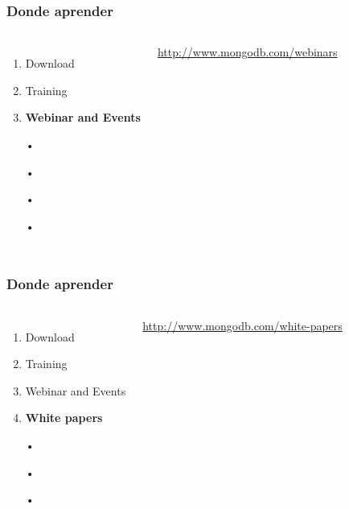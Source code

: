 \documentclass{beamer}
\begin{document}
\begin{frame}
\frametitle{Donde aprender}
\begin{columns}[c] %
\begin{enumerate}
\item Download
\item Training
\item \textbf{Webinar and Events}
\item[•]
\item[•]
\item[•]
\item[•]
\end{enumerate}

{\color{blue}\url{http://www.mongodb.com/webinars}}
\end{columns}
\end{frame}
\begin{frame}
\frametitle{Donde aprender}
\begin{columns}[c] %
\begin{enumerate}
\item Download
\item Training
\item Webinar and Events
\item \textbf{White papers}
\item[•]
\item[•]
\item[•]
\end{enumerate}

{\color{blue}\url{http://www.mongodb.com/white-papers}}
\end{columns}
\end{frame}
\end{document}
